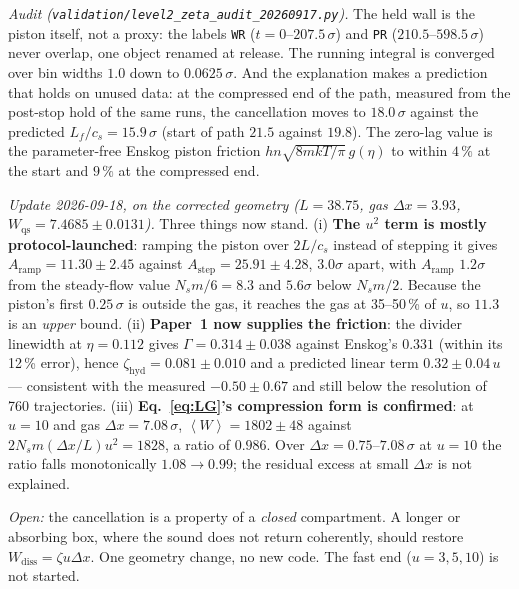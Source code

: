 \documentclass[11pt,a4paper]{article}
\newcommand{\avg}[1]{\left\langle #1 \right\rangle}
\begin{document}
\begin{res}
\emph{Audit (\texttt{validation/level2\_zeta\_audit\_20260917.py}).} The held wall is the piston itself, not a proxy: the labels \texttt{WR} ($t = 0$--$207.5\,\sigma$) and \texttt{PR} ($210.5$--$598.5\,\sigma$) never overlap, one object renamed at release. The running integral is converged over bin widths $1.0$ down to $0.0625\,\sigma$. And the explanation makes a prediction that holds on unused data: at the compressed end of the path, measured from the post-stop hold of the same runs, the cancellation moves to $18.0\,\sigma$ against the predicted $L_f/c_s = 15.9\,\sigma$ (start of path $21.5$ against $19.8$). The zero-lag value is the parameter-free Enskog piston friction $h n \sqrt{8mkT/\pi}\,g(\eta)$ to within $4\,\%$ at the start and $9\,\%$ at the compressed end.

\emph{Update 2026-09-18, on the corrected geometry ($L = 38.75$, gas $\Delta x = 3.93$, $W_{\mathrm{qs}} = 7.4685 \pm 0.0131$).} Three things now stand. (i) \textbf{The $u^2$ term is mostly protocol-launched}: ramping the piston over $2L/c_s$ instead of stepping it gives $A_{\mathrm{ramp}} = 11.30 \pm 2.45$ against $A_{\mathrm{step}} = 25.91 \pm 4.28$, $3.0\sigma$ apart, with $A_{\mathrm{ramp}}$ $1.2\sigma$ from the steady-flow value $N_s m/6 = 8.3$ and $5.6\sigma$ below $N_s m/2$. Because the piston's first $0.25\,\sigma$ is outside the gas, it reaches the gas at 35--50\,\% of $u$, so $11.3$ is an \emph{upper} bound. (ii) \textbf{Paper~1 now supplies the friction}: the divider linewidth at $\eta = 0.112$ gives $\Gamma = 0.314 \pm 0.038$ against Enskog's $0.331$ (within its 12\,\% error), hence $\zeta_{\mathrm{hyd}} = 0.081 \pm 0.010$ and a predicted linear term $0.32 \pm 0.04\,u$ --- consistent with the measured $-0.50 \pm 0.67$ and still below the resolution of 760 trajectories. (iii) \textbf{Eq.~\eqref{eq:LG}'s compression form is confirmed}: at $u = 10$ and gas $\Delta x = 7.08\,\sigma$, $\avg W = 1802 \pm 48$ against $2N_s m (\Delta x/L) u^2 = 1828$, a ratio of $0.986$. Over $\Delta x = 0.75$--$7.08\,\sigma$ at $u = 10$ the ratio falls monotonically $1.08 \to 0.99$; the residual excess at small $\Delta x$ is not explained.

\emph{Open:} the cancellation is a property of a \emph{closed} compartment. A longer or absorbing box, where the sound does not return coherently, should restore $W_{\mathrm{diss}} = \zeta u \Delta x$. One geometry change, no new code. The fast end ($u = 3, 5, 10$) is not started.
\end{res}
\end{document}
